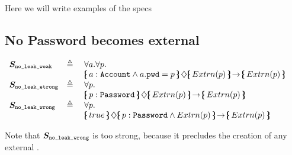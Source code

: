 Here we will write examples of the specs

\subsection{No Password becomes external}

$\begin{array}{lll}
 \Spec{no\_leak\_weak} & \triangleq &  \forall a.  \forall p.\\
 & &   \onlyIf{a:\prg{Account}\wedge a.\prg{pwd}=p} {\external{p}} {\external{p}}\   
\\

 \Spec{no\_leak\_strong} & \triangleq &  \forall p.\\
 & &   \onlyIf{p:\prg{Password}} {\external{p}} {\external{p}}\  \\
 \Spec{no\_leak\_wrong} & \triangleq\ & \forall p. \\
 & &    \onlyIf{true} {p:\prg{Password} \wedge \external{p}} {\external{p}} 

\end{array}
$

\noindent
Note that  $\boldmath{S}_{{\texttt{no\_leak\_wrong}}} $ is too strong, because it precludes the creation of any external  .